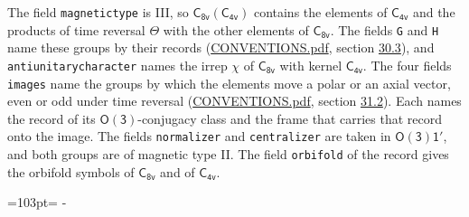 \documentclass[10pt,a4paper]{article}
\newcommand{\needspace}[1]{\par\penalty-100\begingroup\dimen0=#1\relax\dimen2=\pagegoal
  \advance\dimen2-\pagetotal\ifdim\dimen0>\dimen2\relax\ifdim\dimen2>0pt\vfil\break\fi\fi
  \endgroup}
\numberwithin{equation}{section}
\newcommand{\grp}[1]{\mathsf{#1}}
\begin{document}
The field \texttt{magnetictype} is III, so $\grp{C_{8v}}(\grp{C_{4v}})$ contains the elements of $\grp{C_{4v}}$ and the products of time reversal $\varTheta$ with the other elements of $\grp{C_{8v}}$. The fields \texttt{G} and \texttt{H} name these groups by their records (\href{../../CONVENTIONS.pdf}{CONVENTIONS.pdf}, section \href{../../CONVENTIONS.pdf\#conv.30.3}{30.3}), and \texttt{antiunitarycharacter} names the irrep $\chi$ of $\grp{C_{8v}}$ with kernel $\grp{C_{4v}}$. The four fields \texttt{images} name the groups by which the elements move a polar or an axial vector, even or odd under time reversal (\href{../../CONVENTIONS.pdf}{CONVENTIONS.pdf}, section \href{../../CONVENTIONS.pdf\#conv.31.2}{31.2}). Each names the record of its $\grp{O(3)}$-conjugacy class and the frame that carries that record onto the image. The fields \texttt{normalizer} and \texttt{centralizer} are taken in $\grp{O(3)1'}$, and both groups are of magnetic type II. The field \texttt{orbifold} of the record gives the orbifold symbols of $\grp{C_{8v}}$ and of $\grp{C_{4v}}$.
\needspace{103pt}
\end{document}
